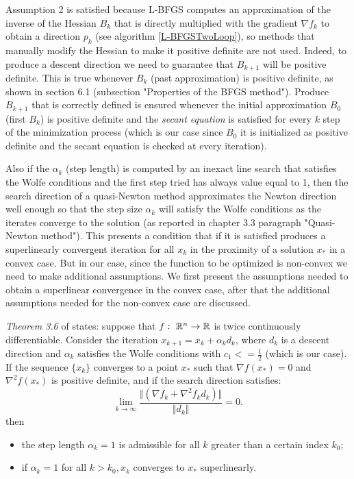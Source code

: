 Assumption 2 is satisfied because L-BFGS computes an approximation of the inverse of the Hessian $B_{k}$ that is directly multiplied with the gradient $\nabla f_{k}$ to obtain a direction $p_{k}$ (see algorithm \ref{L-BFGSTwoLoop}), so methods that manually modify the Hessian to make it positive definite are not used. Indeed, to produce a descent direction we need to guarantee that $B_{k+1}$  will be positive definite. This is true whenever $B_{k}$ (past approximation) is positive definite, as shown in \cite{numerical} section 6.1 (subsection "Properties of the BFGS method"). Produce $B_{k+1}$ that is correctly defined is ensured whenever the initial approximation $B_{0}$ (first $B_{k}$) is positive definite and the \textit{secant equation} is satisfied for every $k$ step of the minimization process (which is our case since $B_{0}$ it is initialized as positive definite and the secant equation is checked at every iteration). 

Also if the $\alpha_{k}$ (step length) is computed by an inexact line search that satisfies the Wolfe conditions and the first step tried has always value equal to 1, then the search direction of a quasi-Newton method approximates the Newton direction well enough so that the step size $\alpha_{k}$ will satisfy the Wolfe conditions as the iterates converge to the solution (as reported in \cite{numerical} chapter 3.3 paragraph "Quasi-Newton method"). This presents a condition that if it is satisfied produces a superlinearly convergent iteration for all $x_{k}$ in the proximity of a solution $x_{*}$ in a convex case. But in our case, since the function to be optimized is non-convex we need to make additional assumptions. We first present the assumptions needed to obtain a superlinear convergence in the convex case, after that the additional assumptions needed for the non-convex case are discussed.

\textit{Theorem 3.6} of \cite{numerical} states: suppose that $f: \textnormal{ }\mathbb{R}^n \rightarrow \mathbb{R}$ is twice continuously differentiable. Consider the iteration $x_{k+1} = x_{k} + \alpha_{k}d_{k}$, where $d_{k}$ is a descent direction and $\alpha_{k}$ satisfies the Wolfe conditions with $c_{1} <= \frac{1}{2}$ (which is our case). If the sequence $\{ x_{k} \}$ converges to a point $x_{*}$ such that $\nabla f(x_{*}) = 0$ and $\nabla^2f(x_{*})$ is positive definite, and if the search direction satisfies: 
\begin{equation}
\label{FirstConditionAlpha}
 \lim_{k\to\infty}\frac{\Vert (\nabla f_{k} + \nabla^2 f_{k} d_{k})\Vert}{\Vert d_{k} \Vert} = 0.
\end{equation} 
then 
\begin{itemize}
	\item the step length $\alpha_{k} = 1$ is admissible for all $k$ greater than a certain index $k_{0}$;
	\item if $\alpha_{k} = 1$ for all $k>k_{0}, x_{k}$ converges to $x_{*}$ superlinearly.
\end{itemize}

